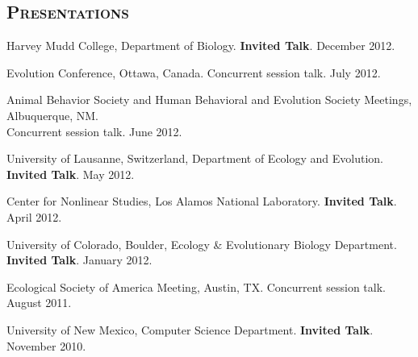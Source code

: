 \documentclass[centered,overlapped,line]{res}
\begin{document}
\begin{resume}
  { \setlength{\parskip}{1.25ex}

  }


  \newpage




  \pagestyle{fancy}
  \section{\bf \large \scshape  Presentations}
  \setlength{\parskip}{1.0ex plus 1ex minus .2ex}
  \vspace{1ex}

  Harvey Mudd College, Department of Biology.  \textbf{Invited Talk}. December 2012.

  Evolution Conference, Ottawa, Canada. Concurrent session talk. July 2012.

  Animal Behavior Society and Human Behavioral and Evolution Society Meetings, Albuquerque, NM.  \\
  Concurrent session talk.  June 2012.

  University of Lausanne, Switzerland, Department of Ecology and Evolution. \textbf{Invited Talk}. May 2012.

  Center for Nonlinear Studies, Los Alamos National Laboratory. \textbf{Invited Talk}. April 2012.

  University of Colorado, Boulder, Ecology \& Evolutionary Biology Department. \textbf{Invited Talk}. January 2012.

  Ecological Society of America Meeting, Austin, TX. Concurrent session talk. August 2011.

  University of New Mexico, Computer Science Department.  \textbf{Invited Talk}. November 2010.


\end{resume}
\end{document}
